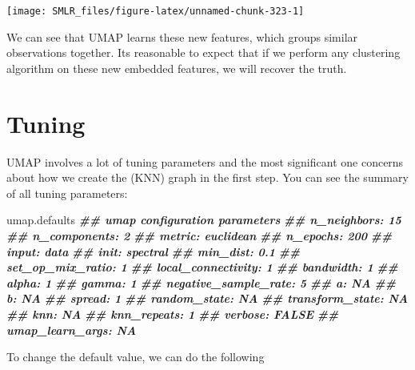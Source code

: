\documentclass[
]{book}
\newenvironment{Shaded}{\begin{snugshade}}{\end{snugshade}}
\newcommand{\AttributeTok}[1]{\textcolor[rgb]{0.13,0.29,0.53}{#1}}
\newcommand{\DecValTok}[1]{\textcolor[rgb]{0.00,0.00,0.81}{#1}}
\newcommand{\DocumentationTok}[1]{\textcolor[rgb]{0.56,0.35,0.01}{\textbf{\textit{#1}}}}
\newcommand{\FunctionTok}[1]{\textcolor[rgb]{0.13,0.29,0.53}{\textbf{#1}}}
\newcommand{\NormalTok}[1]{#1}
\newcommand{\OtherTok}[1]{\textcolor[rgb]{0.56,0.35,0.01}{#1}}
\newcommand{\SpecialCharTok}[1]{\textcolor[rgb]{0.81,0.36,0.00}{\textbf{#1}}}
\theoremstyle{definition}
\theoremstyle{definition}
\theoremstyle{definition}
\theoremstyle{definition}
\theoremstyle{remark}
\begin{document}
\begin{center}\texttt{[image: SMLR\_files/figure-latex/unnamed-chunk-323-1]} \end{center}

We can see that UMAP learns these new features, which groups similar observations together. Its reasonable to expect that if we perform any clustering algorithm on these new embedded features, we will recover the truth.

\hypertarget{tuning}{%
\section{Tuning}\label{tuning}}

UMAP involves a lot of tuning parameters and the most significant one concerns about how we create the (KNN) graph in the first step. You can see the summary of all tuning parameters:

\begin{Shaded}
\begin{Highlighting}[]
\NormalTok{  umap.defaults}
\DocumentationTok{\#\# umap configuration parameters}
\DocumentationTok{\#\#            n\_neighbors: 15}
\DocumentationTok{\#\#           n\_components: 2}
\DocumentationTok{\#\#                 metric: euclidean}
\DocumentationTok{\#\#               n\_epochs: 200}
\DocumentationTok{\#\#                  input: data}
\DocumentationTok{\#\#                   init: spectral}
\DocumentationTok{\#\#               min\_dist: 0.1}
\DocumentationTok{\#\#       set\_op\_mix\_ratio: 1}
\DocumentationTok{\#\#     local\_connectivity: 1}
\DocumentationTok{\#\#              bandwidth: 1}
\DocumentationTok{\#\#                  alpha: 1}
\DocumentationTok{\#\#                  gamma: 1}
\DocumentationTok{\#\#   negative\_sample\_rate: 5}
\DocumentationTok{\#\#                      a: NA}
\DocumentationTok{\#\#                      b: NA}
\DocumentationTok{\#\#                 spread: 1}
\DocumentationTok{\#\#           random\_state: NA}
\DocumentationTok{\#\#        transform\_state: NA}
\DocumentationTok{\#\#                    knn: NA}
\DocumentationTok{\#\#            knn\_repeats: 1}
\DocumentationTok{\#\#                verbose: FALSE}
\DocumentationTok{\#\#        umap\_learn\_args: NA}
\end{Highlighting}
\end{Shaded}

To change the default value, we can do the following

\begin{Shaded}
\end{Shaded}
\end{document}
